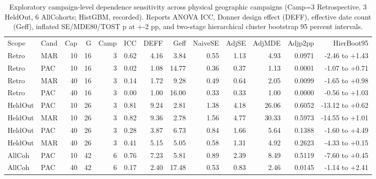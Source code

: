 \begin{table}[!ht]
\centering\footnotesize\setlength{\tabcolsep}{2.2pt}
\caption{Exploratory campaign-level dependence sensitivity across physical geographic campaigns (Camp=3 Retrospective, 3 HeldOut, 6 AllCohorts; HistGBM, recorded). Reports ANOVA ICC, Donner design effect (DEFF), effective date count (Geff), inflated SE/MDE80/TOST p at +-2 pp, and two-stage hierarchical cluster bootstrap 95 percent intervals.}
\begin{tabular}{llrrrrrrrrrrr}
\hline
Scope & Cand & Cap & G & Camp & ICC & DEFF & Geff & NaiveSE & AdjSE & AdjMDE & Adjp2pp & HierBoot95 \\
Retro & MAR & 10 & 16 & 3 & 0.62 & 4.16 & 3.84 & 0.55 & 1.13 & 4.93 & 0.0971 & -2.46 to +1.43 \\
Retro & PAC & 10 & 16 & 3 & 0.02 & 1.08 & 14.77 & 0.36 & 0.37 & 1.13 & 0.0001 & -1.07 to +0.71 \\
Retro & MAR & 40 & 16 & 3 & 0.14 & 1.72 & 9.28 & 0.49 & 0.64 & 2.05 & 0.0099 & -1.65 to +0.98 \\
Retro & PAC & 40 & 16 & 3 & 0.00 & 1.00 & 16.00 & 0.33 & 0.33 & 1.00 & 0.0000 & -0.56 to +1.03 \\
HeldOut & PAC & 10 & 26 & 3 & 0.81 & 9.24 & 2.81 & 1.38 & 4.18 & 26.06 & 0.6052 & -13.12 to +0.62 \\
HeldOut & MAR & 10 & 26 & 3 & 0.82 & 9.36 & 2.78 & 1.56 & 4.77 & 30.33 & 0.5973 & -14.55 to +1.01 \\
HeldOut & PAC & 40 & 26 & 3 & 0.28 & 3.87 & 6.73 & 0.84 & 1.66 & 5.64 & 0.1388 & -1.60 to +4.49 \\
HeldOut & MAR & 40 & 26 & 3 & 0.41 & 5.15 & 5.05 & 0.58 & 1.31 & 4.92 & 0.2623 & -4.33 to +0.15 \\
AllCoh & PAC & 10 & 42 & 6 & 0.76 & 7.23 & 5.81 & 0.89 & 2.39 & 8.49 & 0.5119 & -7.60 to +0.45 \\
AllCoh & PAC & 40 & 42 & 6 & 0.17 & 2.40 & 17.48 & 0.53 & 0.83 & 2.46 & 0.0145 & -1.14 to +2.41 \\
\hline
\end{tabular}
\end{table}
